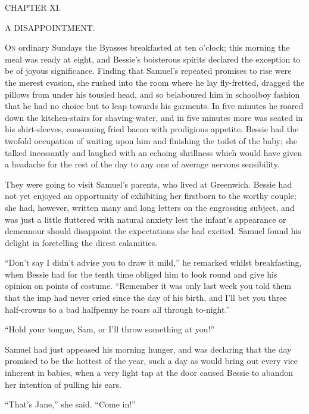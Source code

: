 {}

{CHAPTER XI.}

A DISAPPOINTMENT.

\textsc{On} ordinary Sundays the Byasses breakfasted at ten o'clock;
this morning the meal was ready at eight, and Bessie's boisterous
spirits declared the exception to be of joyous significance. Finding
that Samuel's repeated promises to rise were the merest evasion, she
rushed into the room where he lay fly-fretted, dragged the pillows from
under his tousled head, and so belaboured him in schoolboy fashion that
he had no choice but to leap towards his garments. In five minutes he
roared down the kitchen-stairs for shaving-water, and in five minutes
more was seated in his shirt-sleeves, consuming fried bacon with
prodigious appetite. Bessie had the twofold occupation of waiting upon
him and finishing the toilet of the baby; she talked {}incessantly and
laughed with an echoing shrillness which would have given a headache for
the rest of the day to any one of average nervons sensibility.

They were going to visit Samuel's parents, who lived at Greenwich.
Bessie had not yet enjoyed an opportunity of exhibiting her firstborn to
the worthy couple; she had, however, written many and long letters on
the engrossing subject, and was just a little fluttered with natural
anxiety lest the infant's appearance or demeanour should disappoint the
expectations she had excited. Samuel found his delight in foretelling
the direst calamities.

``Don't say I didn't advise you to draw it mild,'' he remarked whilst
breakfasting, when Bessie had for the tenth time obliged him to look
round and give his opinion on points of costume. ``Remember it was only
last week you told them that the imp had never cried since the day of
his birth, and I'll bet you three half-crowns to a bad halfpenny he
roars all through to-night.''

{}``Hold your tongue, Sam, or I'll throw something at you!''

Samuel had just appeased his morning hunger, and was declaring that the
day promised to be the hottest of the year, such a day as would bring
out every vice inherent in babies, when a very light tap at the door
caused Bessie to abandon her intention of pulling his ears.

``That's Jane,'' she said. ``Come in!''

